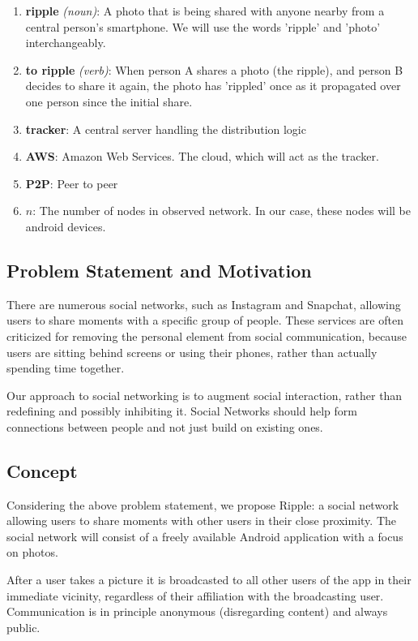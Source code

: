 \documentclass{report}
\begin{document}
\begin{enumerate}
\item \textbf{ripple} \textit{(noun)}: A photo that is being shared with anyone nearby from a central person's smartphone. We will use the words 'ripple' and 'photo' interchangeably. 
\item \textbf{to ripple} \textit{(verb)}: When person A shares a photo (the ripple), and person B decides to share it again, the photo has 'rippled' once as it propagated over one person since the initial share.
\item \textbf{tracker}: A central server handling the distribution logic
\item \textbf{AWS}: Amazon Web Services. The cloud, which will act as the tracker.
\item \textbf{P2P}: Peer to peer
\item \textbf{$ n $}: The number of nodes in observed network. In our case, these nodes will be android devices.
\end{enumerate}

\subsection{Problem Statement and Motivation}
There are numerous social networks, such as Instagram and Snapchat, allowing users to share moments with a specific group of people.
These services are often criticized for removing the personal element from social communication, because users are sitting behind screens or using their phones, rather than actually spending time together.

Our approach to social networking is to augment social interaction, rather than redefining and possibly inhibiting it. Social Networks should help form connections between people and not just build on existing ones.

\subsection{Concept}
Considering the above problem statement, we propose Ripple: a social network allowing users to share moments with other users in their close proximity. The social network will consist of a freely available Android application with a focus on photos.

After a user takes a picture it is broadcasted to all other users of the app in their immediate vicinity, regardless of their affiliation with the broadcasting user. Communication is in principle anonymous (disregarding content) and always public.
\end{document}
